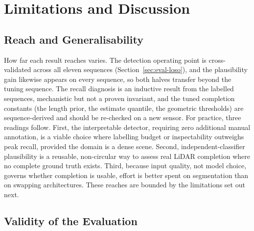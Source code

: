 \section{Limitations and Discussion}
\label{sec:disc-limitations}

\subsection{Reach and Generalisability}
\label{sec:disc-what-holds}

How far each result reaches varies. The detection operating point is cross-validated across all eleven
sequences (Section~\ref{sec:eval-loso}), and the plausibility gain likewise appears on every
sequence, so both halves transfer beyond the tuning sequence. The recall diagnosis is an
inductive result from the labelled sequences, mechanistic but not a proven invariant, and the
tuned completion constants (the length prior, the estimate quantile, the geometric
thresholds) are sequence-derived and should be re-checked on a new sensor. For practice, three
readings follow. First, the interpretable detector, requiring zero additional manual
annotation, is a viable choice where labelling budget or inspectability outweighs peak
recall, provided the domain is a dense scene. Second, independent-classifier plausibility is
a reusable, non-circular way to assess real LiDAR completion where no complete ground truth
exists. Third, because input quality, not model choice, governs whether completion is usable,
effort is better spent on segmentation than on swapping architectures. These reaches are bounded by the limitations set out next.

\subsection{Validity of the Evaluation}
\label{sec:disc-eval-validity}

